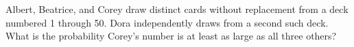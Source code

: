 Albert, Beatrice, and Corey draw distinct cards without replacement from a deck numbered 1 through 50. Dora independently draws from a second such deck. What is the probability Corey's number is at least as large as all three others?

